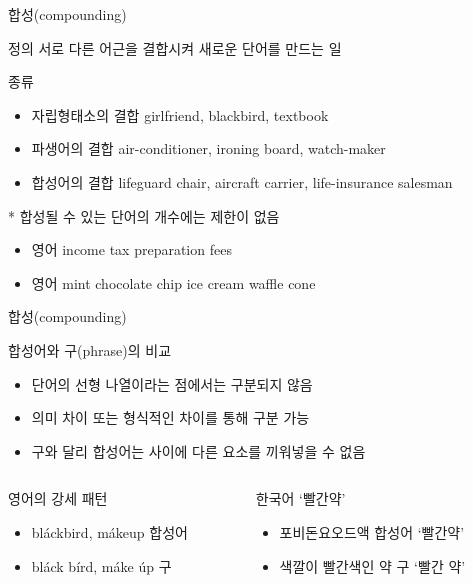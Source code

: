 \documentclass[11pt, aspectratio=169]{beamer}
\newcommand{\texttnr}[1]{{\tnrfont #1}}
\begin{document}
\begin{frame}[t]{합성(compounding)}
  \begin{block}{정의}
    서로 다른 어근을 결합시켜 새로운 단어를 만드는 일
  \end{block}
  \begin{block}{종류}
    \begin{itemize}
      \item 자립형태소의 결합 girlfriend, blackbird, textbook
      \item 파생어의 결합 air-conditioner, ironing board, watch-maker
      \item 합성어의 결합 lifeguard chair, aircraft carrier, life-insurance salesman
    \end{itemize}
  \end{block}
  * 합성될 수 있는 단어의 개수에는 제한이 없음
  \begin{itemize}
    \item 영어 income tax preparation fees
    \item 영어 mint chocolate chip ice cream waffle cone
  \end{itemize}
\end{frame}

\begin{frame}[t]{합성(compounding)}
  \begin{block}{합성어와 구(phrase)의 비교}
    \begin{itemize}
      \item 단어의 선형 나열이라는 점에서는 구분되지 않음
      \item 의미 차이 또는 형식적인 차이를 통해 구분 가능
      \item 구와 달리 합성어는 사이에 다른 요소를 끼워넣을 수 없음
    \end{itemize}
  \end{block}
  \begin{columns}
    \begin{column}{0.46\textwidth}
      \begin{block}{영어의 강세 패턴}
      \begin{itemize}
        \item \texttnr{bláckbird, mákeup} \leftarrow 합성어
        \item \texttnr{bláck bírd, máke úp} \leftarrow 구 
      \end{itemize}        
      \end{block}
    \end{column}
    \begin{column}{0.47\textwidth}
      \begin{block}{한국어 ‘빨간약’}
      \begin{itemize}
        \item 포비돈요오드액 \leftarrow 합성어 ‘빨간약’
        \item 색깔이 빨간색인 약 \leftarrow 구 ‘빨간 약’
      \end{itemize}
      \end{block}      
    \end{column}
  \end{columns}
\end{frame}
\end{document}
